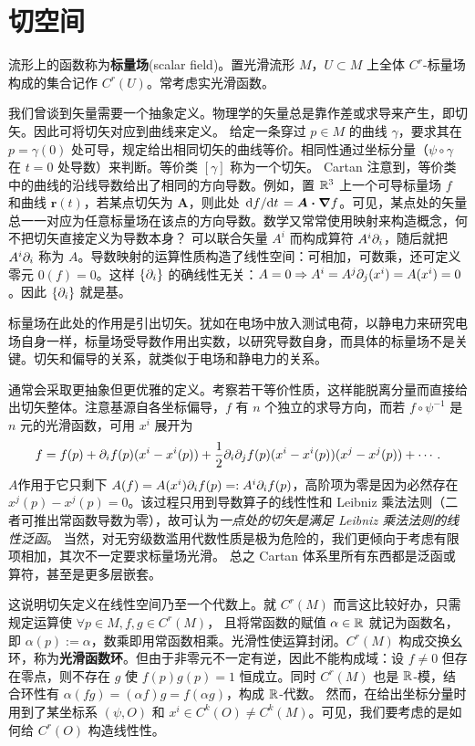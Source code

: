 \section{切空间}

\begin{definition}
    流形上的函数称为\textbf{标量场}(scalar field)。置光滑流形 $M$，$U\subset M$ 上全体 $C^r$-标量场构成的集合记作 $C^r(U)$。常考虑实光滑函数。
\end{definition}

我们曾谈到矢量需要一个抽象定义。物理学的矢量总是靠作差或求导来产生，即切矢。因此可将切矢对应到曲线来定义。
给定一条穿过 $p\in M$ 的曲线 $\gamma$，要求其在 $p=\gamma(0)$ 处可导，规定给出相同切矢的曲线等价。相同性通过坐标分量（$\psi\circ\gamma$ 在 $t=0$ 处导数）来判断。等价类 $[\gamma]$ 称为一个切矢。
Cartan 注意到，等价类中的曲线的沿线导数给出了相同的方向导数。例如，置 $\mathbb{R}^3$ 上一个可导标量场 $f$ 和曲线 $\bm r(t)$，若某点切矢为 $\bm A$，则此处 $\dv*{f}{t}=\vb*{A\cdot\nabla} f$。可见，某点处的矢量总一一对应为任意标量场在该点的方向导数。数学又常常使用映射来构造概念，何不把切矢直接定义为导数本身？
可以联合矢量 $A^i$ 而构成算符 $A^i\partial_i$，随后就把 $A^i\partial_i$ 称为 $A$。导数映射的运算性质构造了线性空间：可相加，可数乘，还可定义零元 $0(f)=0$。这样 $\{\partial_i\}$ 的确线性无关：$A=0\Rightarrow A^i=A^j\partial_j(x^i)=A(x^i)=0$。因此 $\{\partial_i\}$ 就是基。

标量场在此处的作用是引出切矢。犹如在电场中放入测试电荷，以静电力来研究电场自身一样，标量场受导数作用出实数，以研究导数自身，而具体的标量场不是关键。切矢和偏导的关系，就类似于电场和静电力的关系。

通常会采取更抽象但更优雅的定义。考察若干等价性质，这样能脱离分量而直接给出切矢整体。注意基源自各坐标偏导，$f$ 有 $n$ 个独立的求导方向，而若 $f\circ\psi^{-1}$ 是 $n$ 元的光滑函数，可用 $x^i$ 展开为
\[
    f=f(p)+\partial_i f(p)(x^i-x^i(p))+ \frac 12\partial_i\partial_j f(p)(x^i-x^i(p))(x^j-x^j(p))+\cdots.
\]
$A$作用于它只剩下 $A(f)=A(x^i)\partial_i f(p)=:A^i\partial_i f(p)$，高阶项为零是因为必然存在 $x^j(p)-x^j(p)=0$。该过程只用到导数算子的线性性和 Leibniz 乘法法则（二者可推出常函数导数为零），故可认为\textit{一点处的切矢是满足 Leibniz 乘法法则的线性泛函}。
当然，对无穷级数滥用代数性质是极为危险的，我们更倾向于考虑有限项相加，其次不一定要求标量场光滑。
总之 Cartan 体系里所有东西都是泛函或算符，甚至是更多层嵌套。

这说明切矢定义在线性空间乃至一个代数上。就 $C^r(M)$ 而言这比较好办，只需规定运算使 $\forall p\in M,f,g\in C^r(M)$，
且将常函数的赋值 $\alpha\in\mathbb{R}$ 就记为函数名，即 $\alpha(p):=\alpha$，数乘即用常函数相乘。光滑性使运算封闭。$C^r(M)$ 构成交换幺环，称为\textbf{光滑函数环}。但由于非零元不一定有逆，因此不能构成域：设 $f\ne 0$ 但存在零点，则不存在 $g$ 使 $f(p)g(p)=1$ 恒成立。同时 $C^r(M)$ 也是 $\mathbb{R}$-模，结合环性有 $\alpha(fg)=(\alpha f) g=f(\alpha g)$，构成 $\mathbb{R}$-代数。
然而，在给出坐标分量时用到了某坐标系 $(\psi,O)$ 和 $x^i\in C^k(O)\ne C^k(M)$。可见，我们要考虑的是如何给 $C^r(O)$ 构造线性性。

